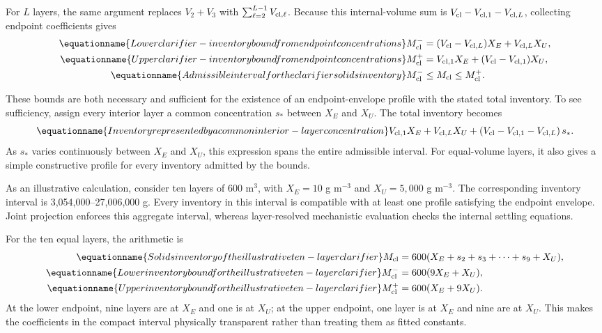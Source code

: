 For $L$ layers, the same argument replaces $V_2+V_3$ with $\sum_{\ell=2}^{L-1}V_{{\rm cl},\ell}$. Because this internal-volume sum is $V_{\rm cl}-V_{{\rm cl},1}-V_{{\rm cl},L}$, collecting endpoint coefficients gives
\begin{align}
\equationname{Lower clarifier-inventory bound from endpoint concentrations}
M_{\rm cl}^{-}&=(V_{\rm cl}-V_{{\rm cl},L})X_E+V_{{\rm cl},L}X_U,\\
\equationname{Upper clarifier-inventory bound from endpoint concentrations}
M_{\rm cl}^{+}&=V_{{\rm cl},1}X_E+(V_{\rm cl}-V_{{\rm cl},1})X_U,\\
\equationname{Admissible interval for the clarifier solids inventory}
M_{\rm cl}^{-}&\le M_{\rm cl}\le M_{\rm cl}^{+}.
\label{eq:plant_inventory_bounds}
\end{align}

These bounds are both necessary and sufficient for the existence of an endpoint-envelope profile with the stated total inventory. To see sufficiency, assign every interior layer a common concentration $s_*$ between $X_E$ and $X_U$. The total inventory becomes
\begin{equation}
\equationname{Inventory represented by a common interior-layer concentration}
V_{{\rm cl},1}X_E+V_{{\rm cl},L}X_U
+\left(V_{\rm cl}-V_{{\rm cl},1}-V_{{\rm cl},L}\right)s_*.
\end{equation}
As $s_*$ varies continuously between $X_E$ and $X_U$, this expression spans the entire admissible interval. For equal-volume layers, it also gives a simple constructive profile for every inventory admitted by the bounds.

As an illustrative calculation, consider ten layers of 600 m$^3$, with $X_E=10$ g m$^{-3}$ and $X_U=5{,}000$ g m$^{-3}$. The corresponding inventory interval is 3{,}054{,}000--27{,}006{,}000 g. Every inventory in this interval is compatible with at least one profile satisfying the endpoint envelope. Joint projection enforces this aggregate interval, whereas layer-resolved mechanistic evaluation checks the internal settling equations.

For the ten equal layers, the arithmetic is
\begin{align}
\equationname{Solids inventory of the illustrative ten-layer clarifier}
M_{\rm cl}&=600(X_E+s_2+s_3+\cdots+s_9+X_U),\\
\equationname{Lower inventory bound for the illustrative ten-layer clarifier}
M_{\rm cl}^{-}&=600(9X_E+X_U),\\
\equationname{Upper inventory bound for the illustrative ten-layer clarifier}
M_{\rm cl}^{+}&=600(X_E+9X_U).
\end{align}
At the lower endpoint, nine layers are at $X_E$ and one is at $X_U$; at the upper endpoint, one layer is at $X_E$ and nine are at $X_U$. This makes the coefficients in the compact interval physically transparent rather than treating them as fitted constants.

